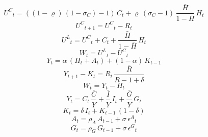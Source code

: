 \begin{dmath}
{U^{C}}_{t}=\left(\left(1-{{\varrho}}\right)\, \left(1-{{\sigma_{C}}}\right)-1\right)\, {C}_{t}+{{\varrho}}\, \left({{\sigma_{C}}}-1\right)\, \frac{{\bar{H}}}{1-{\bar{H}}}\, {H}_{t}
\end{dmath}
\begin{dmath}
{U^{C}}_{t+1}={U^{C}}_{t}-{R}_{t}
\end{dmath}
\begin{dmath}
{U^{L}}_{t}={U^{C}}_{t}+{C}_{t}+\frac{{\bar{H}}}{1-{\bar{H}}}\, {H}_{t}
\end{dmath}
\begin{dmath}
{W}_{t}={U^{L}}_{t}-{U^{C}}_{t}
\end{dmath}
\begin{dmath}
{Y}_{t}={{\alpha}}\, \left({H}_{t}+{A}_{t}\right)+\left(1-{{\alpha}}\right)\, {K}_{t-1}
\end{dmath}
\begin{dmath}
{Y}_{t+1}-{K}_{t}={R}_{t}\, \frac{{\bar{R}}}{{\bar{R}}-1+{{\delta}}}
\end{dmath}
\begin{dmath}
{W}_{t}={Y}_{t}-{H}_{t}
\end{dmath}
\begin{dmath}
{Y}_{t}={C}_{t}\, {\frac{\bar{C}}{\bar{Y}}}+{\frac{\bar{I}}{\bar{Y}}}\, {I}_{t}+{\frac{\bar{G}}{\bar{Y}}}\, {G}_{t}
\end{dmath}
\begin{dmath}
{K}_{t}={{\delta}}\, {I}_{t}+{K}_{t-1}\, \left(1-{{\delta}}\right)
\end{dmath}
\begin{dmath}
{A}_{t}={{\rho_{A}}}\, {A}_{t-1}+{{\sigma}}\, {{\epsilon^{A}}}_{t}
\end{dmath}
\begin{dmath}
{G}_{t}={{\rho_{G}}}\, {G}_{t-1}+{{\sigma}}\, {{\epsilon^{G}}}_{t}
\end{dmath}

